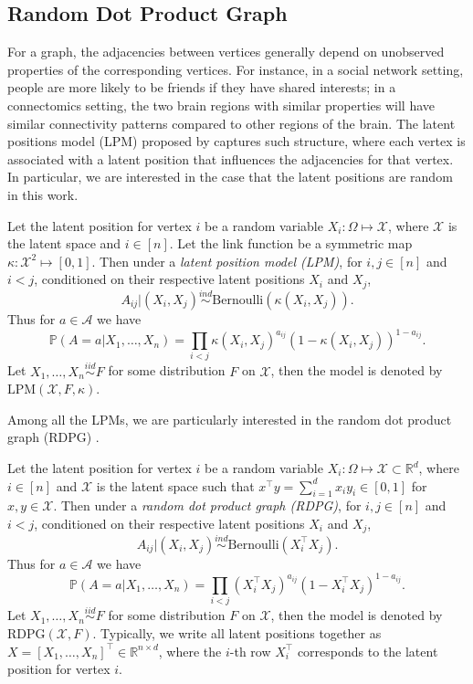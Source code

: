 \subsection{Random Dot Product Graph}
\label{sec:RDPG}
For a graph, the adjacencies between vertices generally depend on unobserved properties of the corresponding vertices. For instance, in a social network setting, people are more likely to be friends if they have shared interests; in a connectomics setting, the two brain regions with similar properties will have similar connectivity patterns compared to other regions of the brain.
The latent positions model (LPM) proposed by \citep{hoff2002latent} captures such structure, where each vertex is associated with a latent position that influences the adjacencies for that vertex. In particular, we are interested in the case that the latent positions are random in this work.

\begin{definition}
\label{def:LPM}
Let the latent position for vertex $i$ be a random variable $X_i: \Omega \mapsto \mathcal{X}$, where $\mathcal{X}$ is the latent space and $i \in [n]$. Let the link function be a symmetric map $\kappa: \mathcal{X}^2 \mapsto [0, 1]$. Then under a {\em{latent position model (LPM)}}, for $i, j \in [n]$ and $i < j$, conditioned on their respective latent positions $X_i$ and $X_j$,
\[
	A_{ij} | (X_i, X_j) \stackrel{ind}{\sim} \mathrm{Bernoulli}(\kappa(X_i, X_j)).
\]
Thus for $a \in \mathcal{A}$ we have
\[
	\mathbb{P}(A = a | X_1, \dots, X_n) = \prod_{i < j} \kappa(X_i, X_j)^{a_{ij}} (1 - \kappa(X_i, X_j))^{1 - a_{ij}}.
\]
Let $X_1, \dots, X_n \stackrel{iid}{\sim} F$ for some distribution $F$ on $\mathcal{X}$, then the model is denoted by $\mathrm{LPM}(\mathcal{X}, F, \kappa)$.
\end{definition}

Among all the LPMs, we are particularly interested in the random dot product graph (RDPG) \citep{young2007random, nickel2008random}.

\begin{definition} 
\label{def:RDPG}
Let the latent position for vertex $i$ be a random variable $X_i: \Omega \mapsto \mathcal{X} \subset \mathbb{R}^{d}$, where $i \in [n]$ and $\mathcal{X}$ is the latent space such that $x^{\top} y = \sum_{i = 1}^d x_i y_i \in [0, 1]$ for $x, y \in \mathcal{X}$. Then under a {\em{random dot product graph (RDPG)}}, for $i, j \in [n]$ and $i < j$, conditioned on their respective latent positions $X_i$ and $X_j$,
\[
	A_{ij} | (X_i, X_j) \stackrel{ind}{\sim} \mathrm{Bernoulli}(X_i^{\top} X_j).
\]
Thus for $a \in \mathcal{A}$ we have
\[
	\mathbb{P}(A = a | X_1, \dots, X_n) = \prod_{i < j} (X_i^{\top} X_j)^{a_{ij}} (1 - X_i^{\top} X_j)^{1 - a_{ij}}.
\]
Let $X_1, \dots, X_n \stackrel{iid}{\sim} F$ for some distribution $F$ on $\mathcal{X}$, then the model is denoted by $\mathrm{RDPG}(\mathcal{X}, F)$.
Typically,  we write all latent positions together as $X = [X_1, \dots, X_n]^{\top} \in \mathbb{R}^{n \times d}$, where the $i$-th row $X_i^{\top}$ corresponds to the latent position for vertex $i$.
\end{definition}

